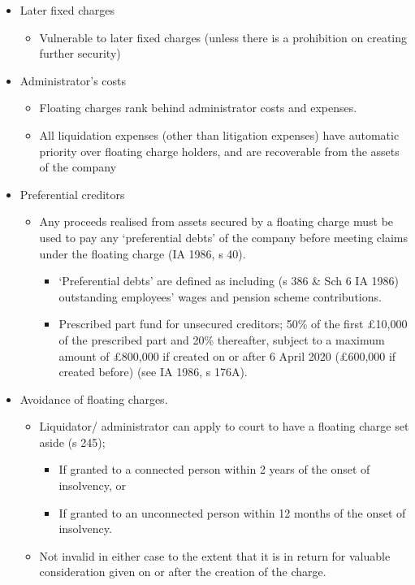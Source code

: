 \documentclass[
]{article}
\providecommand{\tightlist}{%
  \setlength{\itemsep}{0pt}\setlength{\parskip}{0pt}}
\begin{document}
\begin{itemize}
\tightlist
\item
  Later fixed charges

  \begin{itemize}
  \tightlist
  \item
    Vulnerable to later fixed charges (unless there is a prohibition on
    creating further security)
  \end{itemize}
\item
  Administrator's costs

  \begin{itemize}
  \tightlist
  \item
    Floating charges rank behind administrator costs and expenses.
  \item
    All liquidation expenses (other than litigation expenses) have
    automatic priority over floating charge holders, and are recoverable
    from the assets of the company
  \end{itemize}
\item
  Preferential creditors

  \begin{itemize}
  \tightlist
  \item
    Any proceeds realised from assets secured by a floating charge must
    be used to pay any `preferential debts' of the company before
    meeting claims under the floating charge (IA 1986, s 40).

    \begin{itemize}
    \tightlist
    \item
      `Preferential debts' are defined as including (s 386 \& Sch 6 IA
      1986) outstanding employees' wages and pension scheme
      contributions.
    \item
      Prescribed part fund for unsecured creditors; 50\% of the first
      £10,000 of the prescribed part and 20\% thereafter, subject to a
      maximum amount of £800,000 if created on or after 6 April 2020
      (£600,000 if created before) (see IA 1986, s 176A).
    \end{itemize}
  \end{itemize}
\item
  Avoidance of floating charges.

  \begin{itemize}
  \tightlist
  \item
    Liquidator/ administrator can apply to court to have a floating
    charge set aside (s 245);

    \begin{itemize}
    \tightlist
    \item
      If granted to a connected person within 2 years of the onset of
      insolvency, or
    \item
      If granted to an unconnected person within 12 months of the onset
      of insolvency.
    \end{itemize}
  \item
    Not invalid in either case to the extent that it is in return for
    valuable consideration given on or after the creation of the charge.
  \end{itemize}
\end{itemize}
\end{document}
